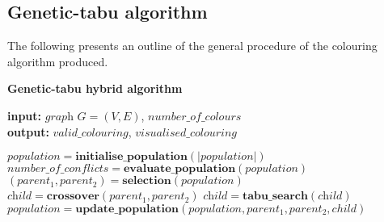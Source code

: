 \documentclass[12pt,a4paper]{article}
\begin{document}
\subsection*{Genetic-tabu algorithm}
\par The following presents an outline of the general procedure of the colouring algorithm produced.
\begin{algorithm}
  \caption{\textbf{Genetic-tabu hybrid algorithm}}
  \label{alg:gentabu}
  \textbf{input:} $\textit{graph } G=(V, E)$,\hspace{0.1cm}  $\textit{number\_of\_colours}$\\
  \textbf{output:} $\textit{valid\_colouring}$,\hspace{0.1cm}  $\textit{visualised\_colouring}$
  \begin{algorithmic}[1]
  \State $\textit{population} = \textbf{initialise\_population}(\vert \textit{population} \vert)$
  	\State $\textit{number\_of\_conflicts} = \textbf{evaluate\_population}(\textit{population})$
  	\State $(parent_1, parent_2) = \textbf{selection}(\textit{population})$
  	\State $\textit{child} = \textbf{crossover}(parent_1, parent_2)$
  	\State $\textit{child} = \textbf{tabu\_search}(\textit{child})$ \label{line:tabu} 
  	\State $\textit{population} = \textbf{update\_population}(population, parent_1, parent_2, child)$
  	\EndWhile
  \end{algorithmic}
\end{algorithm}
\end{document}
